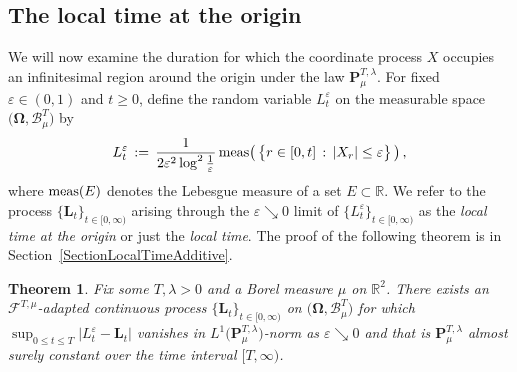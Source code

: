 \documentclass[10pt]{article}
\numberwithin{equation}{section}
\newtheorem{theorem}{Theorem}[section]
\theoremstyle{definition}
\newcommand{\R}{{\mathbb R}}
\begin{document}
   




\subsection{The local time at the origin}\label{SubsectionLocalTime}
We will now examine the duration for which the coordinate process $X$ occupies an infinitesimal region around the origin under the law $\mathbf{P}^{T,\lambda}_{\mu}$.
For fixed $\varepsilon \in (0,1)$ and $t\geq 0$, define  the  random variable $ L_t^{\varepsilon}$ on the measurable space $\big(  \boldsymbol{\Omega}, \mathscr{B}^{T}_{\mu}    \big)$  by
\begin{align}\label{DEFLocaltime}
    L_t^{\varepsilon}\,:=\,\frac{1}{2\varepsilon^2\log^2 \frac{1}{\varepsilon}} \,\textup{meas}\big(\,\big\{r\in [0,t]\,:\, |X_r|\leq \varepsilon  \big\}\,\big)\,,
\end{align}
where $\textup{meas}(E)$ denotes the Lebesgue measure of a  set $E\subset \R$. We refer to the process $\{\mathbf{L}_t\}_{t\in [0,\infty)}$ arising through the $\varepsilon \searrow 0$ limit  of $\{L_t^{\varepsilon}\}_{t\in [0,\infty)}$ as the \textit{local time at the origin} or just the \textit{local time}.
The proof of the following theorem is in Section~\ref{SectionLocalTimeAdditive}.
\begin{theorem}\label{ThmExistenceLocalTime}  Fix some $T,\lambda>0$ and a Borel measure $\mu $ on $\R^2$.  There exists an $\mathscr{F}^{T,\mu}  $-adapted continuous process $\{ \mathbf{L}_t\}_{t\in [0,\infty)}$ on $ \big(  \boldsymbol{\Omega}, \mathscr{B}^{T}_{\mu}    \big) $ for which $\sup_{0\leq t\leq T}\big|  L_t^{\varepsilon}  -\mathbf{L}_t  \big|  $ vanishes in $L^1\big(\mathbf{P}^{T,\lambda}_{\mu}  \big)$-norm as $\varepsilon \searrow 0$ and that is
 $ \mathbf{P}^{T,\lambda}_{\mu}$ almost surely constant over the time interval $[T,\infty)$.
\end{theorem}
\end{document}

